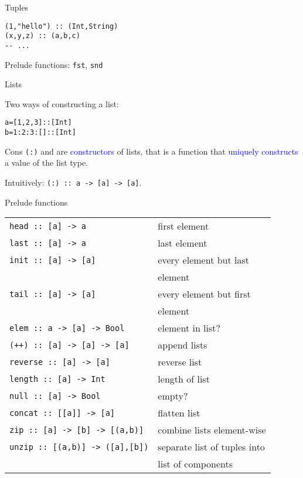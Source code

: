\documentclass{beamer}
\def\code#1{\texttt{\frenchspacing#1}}
\begin{document}
\begin{frame}[fragile]{Tuples}

\begin{verbatim}
(1,"hello") :: (Int,String)
(x,y,z) :: (a,b,c)
-- ...
\end{verbatim}

Prelude functions: \code{fst}, \code{snd}

\end{frame}

\begin{frame}[fragile]{Lists}

Two ways of constructing a list:

\pause

\begin{alltt}
a = [1,2,3]          :: [Int]\pause
b = 1 : 2 : 3 : []   :: [Int]
\end{alltt}

\pause

Cons \code{(:)} and \code{[]} are \textcolor{blue}{constructors} of lists, that is a function that \textcolor{blue}{uniquely constructs} a value of the list type.

\pause

\vspace{1cm}
Intuitively: \code{(:) :: a -> [a] -> [a]}.

\end{frame}

\begin{frame}{Prelude functions}

\begin{tabular}{ll}
    \code{head :: [a] -> a} & first element\pause \\
    \code{last :: [a] -> a} & last element\pause \\
    \code{init :: [a] -> [a]} & every element but last \\
    & element\pause \\
    \code{tail :: [a] -> [a]} & every element but first \\
    & element\pause \\
    \code{elem :: a -> [a] -> Bool} & element in list?\pause \\
    \code{(++) :: [a] -> [a] -> [a]} & append lists\pause \\
    \code{reverse :: [a] -> [a]} & reverse list\pause \\
    \code{length :: [a] -> Int} & length of list\pause \\
    \code{null :: [a] -> Bool} & empty?\pause \\
    \code{concat :: [[a]] -> [a]} & flatten list\pause \\
    \code{zip :: [a] -> [b] -> [(a,b)]} & combine lists element-wise\pause \\
    \code{unzip :: [(a,b)] -> ([a],[b])} & separate list of tuples into \\
    & list of components \\
\end{tabular}

\end{frame}
\end{document}
